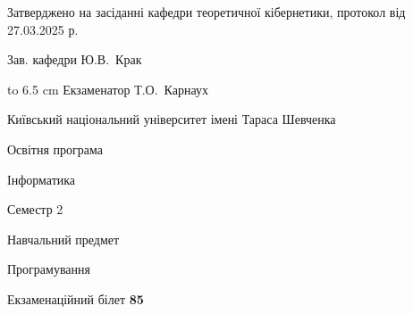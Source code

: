 \documentclass[12pt, ukrainian]{article}
\begin{document}
{\smallskip\smallskip \begin {scriptsize} Затверджено на засіданні кафедри теоретичної кібернетики, протокол   від   27.03.2025 р.\par\smallskip\smallskip\smallskip\smallskip
{\parbox {6.5 cm} {Зав. кафедри \dotfill Ю.В.~Крак}}\hspace {0.7cm} {\hbox to 6.5 cm { Екзаменатор \dotfill Т.О.~Карнаух}} \end{scriptsize}}
\newpage
{{\begin {scriptsize}\par
{ \center  Київський національний університет імені Тараса Шевченка \par}
{\parbox {5 cm}{Освітня програма \hfill}{\parbox {7 cm}{Інформатика\hfill}}\parbox {6 cm}{\hfill Семестр 2}}\par
{\parbox {5 cm} {Навчальний предмет \hfill}\parbox {7 cm}{Програмування \hfill}\parbox {6cm}{\hfill}\par}\vspace{-15pt} \end{scriptsize}}{\center Екзаменаційний білет \No \textbf { 85 }\par}}
\end{document}
